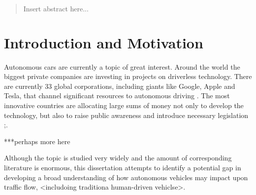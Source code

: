 \documentclass[11pt,english]{article}
\begin{document}





\begin{abstract}
Insert abstract here...
\end{abstract}


\newpage


\tableofcontents %

\newpage %



\section{Introduction and Motivation} %

\paragraph{}
Autonomous cars are currently a topic of  great interest.  Around the world the biggest private companies are investing in projects on driverless technology. There are currently 33 global corporations, including giants like Google, Apple and Tesla, that channel significant resources to autonomous driving \citep{33comp}. The most innovative countries are allocating large sums of money not only to develop the technology, but also to raise public awareness and introduce necessary legislation \citep{pathwaytodriverless};\citep{pathwaytodriverless2}. 

\par
***perhaps more here
\par
Although the topic is studied very widely and the amount of corresponding literature is enormous, this dissertation attempts to identify a potential gap in developing a broad understanding of how autonomous vehicles may impact upon traffic flow, <includoing traditiona human-driven vehiclse>. 
\end{document}
